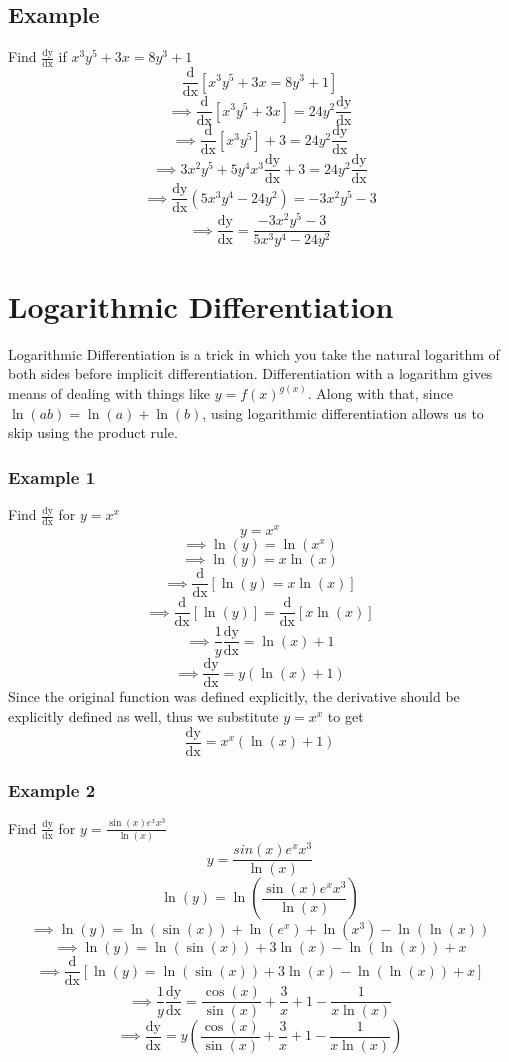 \documentclass[oneside]{book}
\newcommand\tab[1][1cm]{\hspace*{#1}}
\newcommand\nextline{\newline\tab}
\newcommand\ddx[1]{\frac{\text{d}}{\text{dx}}\left[#1\right]}
\newcommand\dydx{\frac{\text{dy}}{\text{dx}}}
\begin{document}
\section{Example}
\tab
Find $\dydx$ if $x^3y^5+3x=8y^3+1$
$$\ddx{x^3y^5+3x=8y^3+1}$$
$$\implies \ddx{x^3y^5+3x} = 24y^2\dydx$$
$$\implies \ddx{x^3y^5} + 3 = 24y^2\dydx$$
$$\implies 3x^2y^5 + 5y^4x^3\dydx + 3 = 24y^2\dydx$$
$$\implies \dydx\left(5x^3y^4-24y^2\right)=-3x^2y^5-3$$
$$\implies \dydx=\frac{-3x^2y^5-3}{5x^3y^4-24y^2}$$
\chapter{Logarithmic Differentiation}
\tab
Logarithmic Differentiation is a trick in which you take the natural logarithm of both sides before implicit differentiation.
\nextline
Differentiation with a logarithm gives means of dealing with things like $y=f(x)^{g(x)}$. Along with that, since $\ln(ab)=\ln(a)+\ln(b)$, using logarithmic differentiation allows us to skip using the product rule.
\subsection{Example 1}
Find $\dydx$ for $y=x^x$
\nextline
$$y=x^x$$
$$\implies \ln(y)=\ln(x^x)$$
$$\implies \ln(y)=x\ln(x)$$
$$\implies \ddx{\ln(y)=x\ln(x)}$$
$$\implies \ddx{\ln(y)}=\ddx{x\ln(x)}$$
$$\implies \frac{1}{y}\dydx = \ln(x)+1$$
$$\implies \dydx=y\left(\ln(x)+1\right)$$
\tab
Since the original function was defined explicitly, the derivative should be explicitly defined as well, thus we substitute $y=x^x$ to get
$$\dydx=x^x\left(\ln(x)+1\right)$$
\subsection{Example 2}
Find $\dydx$ for $y=\frac{\sin(x)e^xx^3}{\ln(x)}$
$$y=\frac{sin(x)e^xx^3}{\ln(x)}$$
$$\ln(y)=\ln\left(\frac{\sin(x)e^xx^3}{\ln(x)}\right)$$
$$\implies \ln(y)=\ln(\sin(x))+\ln(e^x)+\ln(x^3)-\ln(\ln(x))$$
$$\implies \ln(y)=\ln(\sin(x))+3\ln(x)-\ln(\ln(x)) + x$$
$$\implies \ddx{\ln(y)=\ln(\sin(x))+3\ln(x)-\ln(\ln(x)) + x}$$
$$\implies \frac{1}{y}\dydx = \frac{\cos(x)}{\sin(x)} + \frac{3}{x} + 1 - \frac{1}{x\ln(x)}$$
$$\implies \dydx=y\left(\frac{\cos(x)}{\sin(x)} + \frac{3}{x} + 1 - \frac{1}{x\ln(x)}\right)$$
\end{document}
